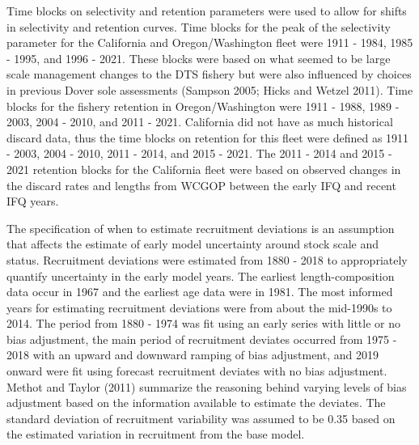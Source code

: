 \documentclass[11pt,
  english,
  a4paper,
]{article}
\begin{document}
\leavevmode\tagmcend\tagstructend\par


Time blocks on selectivity and retention parameters were used to allow for shifts in selectivity and retention curves. Time blocks for the peak of the selectivity parameter for the California and Oregon/Washington fleet were 1911 - 1984, 1985 - 1995, and 1996 - 2021. These blocks were based on what seemed to be large scale management changes to the DTS fishery but were also influenced by choices in previous Dover sole assessments {(Sampson 2005; Hicks and Wetzel 2011)\leavevmode\tagmcend\tagstructend}. Time blocks for the fishery retention in Oregon/Washington were 1911 - 1988, 1989 - 2003, 2004 - 2010, and 2011 - 2021. California did not have as much historical discard data, thus the time blocks on retention for this fleet were defined as 1911 - 2003, 2004 - 2010, 2011 - 2014, and 2015 - 2021. The 2011 - 2014 and 2015 - 2021 retention blocks for the California fleet were based on observed changes in the discard rates and lengths from WCGOP between the early IFQ and recent IFQ years.

\leavevmode\tagmcend\tagstructend\par


The specification of when to estimate recruitment deviations is an assumption that affects the estimate of early model uncertainty around stock scale and status. Recruitment deviations were estimated from 1880 - 2018 to appropriately quantify uncertainty in the early model years. The earliest length-composition data occur in 1967 and the earliest age data were in 1981. The most informed years for estimating recruitment deviations were from about the mid-1990s to 2014. The period from 1880 - 1974 was fit using an early series with little or no bias adjustment, the main period of recruitment deviates occurred from 1975 - 2018 with an upward and downward ramping of bias adjustment, and 2019 onward were fit using forecast recruitment deviates with no bias adjustment. Methot and Taylor {(2011)\leavevmode\tagmcend\tagstructend} summarize the reasoning behind varying levels of bias adjustment based on the information available to estimate the deviates. The standard deviation of recruitment variability was assumed to be 0.35 based on the estimated variation in recruitment from the base model.
\end{document}
